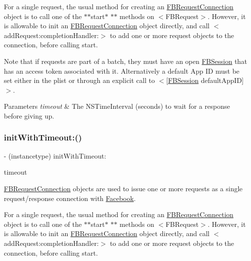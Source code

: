 For a single request, the usual method for creating an {\ttfamily \hyperlink{interfaceFBRequestConnection}{F\+B\+Request\+Connection}} object is to call one of the $\ast$$\ast$start$\ast$ $\ast$$\ast$ methods on $<$\+F\+B\+Request$>$. However, it is allowable to init an {\ttfamily \hyperlink{interfaceFBRequestConnection}{F\+B\+Request\+Connection}} object directly, and call $<$add\+Request\+:completion\+Handler\+:$>$ to add one or more request objects to the connection, before calling start.

Note that if requests are part of a batch, they must have an open \hyperlink{interfaceFBSession}{F\+B\+Session} that has an access token associated with it. Alternatively a default App ID must be set either in the plist or through an explicit call to $<$\mbox{[}\hyperlink{interfaceFBSession}{F\+B\+Session} default\+App\+ID\mbox{]}$>$.


\begin{DoxyParams}{Parameters}
{\em timeout} & The {\ttfamily N\+S\+Time\+Interval} (seconds) to wait for a response before giving up. \\
\hline
\end{DoxyParams}
\mbox{\label{interfaceFBRequestConnection_a00435ea153b22e8613108afdbabcadff}} 
\subsubsection{\texorpdfstring{init\+With\+Timeout\+:()}{initWithTimeout:()}\hspace{0.1cm}{\footnotesize\ttfamily [4/5]}}
{\footnotesize\ttfamily -\/ (instancetype) init\+With\+Timeout\+: \begin{DoxyParamCaption}\item[{(N\+S\+Time\+Interval)}]{timeout }\end{DoxyParamCaption}}

{\ttfamily \hyperlink{interfaceFBRequestConnection}{F\+B\+Request\+Connection}} objects are used to issue one or more requests as a single request/response connection with \hyperlink{interfaceFacebook}{Facebook}.

For a single request, the usual method for creating an {\ttfamily \hyperlink{interfaceFBRequestConnection}{F\+B\+Request\+Connection}} object is to call one of the $\ast$$\ast$start$\ast$ $\ast$$\ast$ methods on $<$\+F\+B\+Request$>$. However, it is allowable to init an {\ttfamily \hyperlink{interfaceFBRequestConnection}{F\+B\+Request\+Connection}} object directly, and call $<$add\+Request\+:completion\+Handler\+:$>$ to add one or more request objects to the connection, before calling start.

